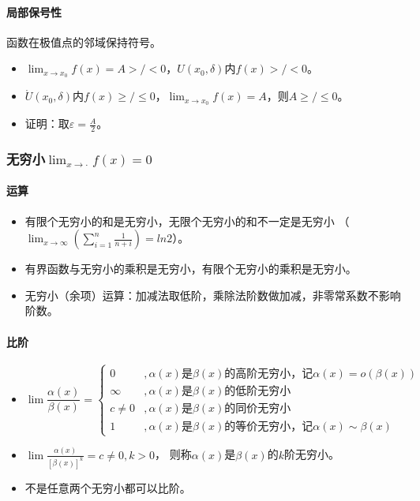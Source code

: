 \documentclass[
12pt, %
a4paper, 
oneside, %
headinclude,footinclude, %
]{scrartcl}
\begin{document}
\paragraph{局部保号性}
函数在极值点的邻域保持符号。
\begin{itemize}
\item $ \lim_{x \to x_0} f(x) = A >/< 0 $，$ U(x_0, \delta) $内$ f(x) >/< 0 $。
\item $ \mathring{U}(x_0, \delta) $内$ f(x) \geq /\leq 0$，$ \lim_{x \to x_0} f(x) = A $，则$ A \geq / \leq 0 $。
\item 证明：取$ \varepsilon = \frac{A}{2} $。
\end{itemize}
\subsubsection[无穷小]{无穷小$ \lim_{x \to \cdot} f(x) = 0 $}
\paragraph{运算}
\begin{itemize}
\item 有限个无穷小的和是无穷小，无限个无穷小的和不一定是无穷小
（$ \lim_{x \to \infty}(\sum_{i = 1}^{n}  \frac{1}{n + i}) = ln 2 $）。
\item 有界函数与无穷小的乘积是无穷小，有限个无穷小的乘积是无穷小。
\item 无穷小（余项）运算：加减法取低阶，乘除法阶数做加减，非零常系数不影响阶数。
\end{itemize}
\paragraph{比阶}
\begin{itemize}
\item 
$$
\lim \frac{\alpha(x)}{\beta(x)}=
\begin{cases}
0 &, \alpha(x) \text{是} \beta(x) \text{的高阶无穷小，记} \alpha(x) = o(\beta(x)) \\
\infty &, \alpha(x) \text{是} \beta(x) \text{的低阶无穷小} \\
c \neq 0 &, \alpha(x) \text{是} \beta(x) \text{的同价无穷小} \\
1 &, \alpha(x) \text{是} \beta(x) \text{的等价无穷小，记} \alpha(x) \sim \beta(x)
\end{cases}
$$
\item $ \lim \frac{\alpha(x)}{[\beta(x)]^k} = c \neq 0, k > 0 $，
则称$ \alpha(x) $是$ \beta(x) $的$ k $阶无穷小。
\item 不是任意两个无穷小都可以比阶。
\end{itemize}
\end{document}
